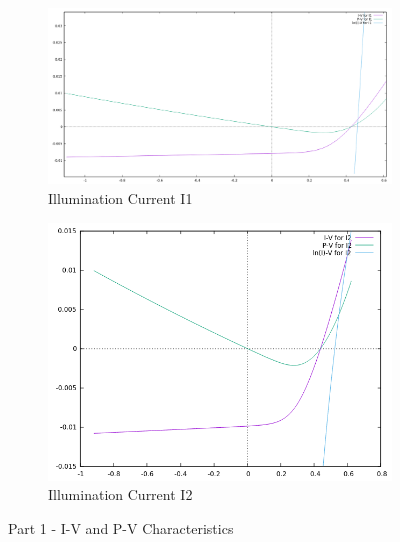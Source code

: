 \documentclass[12pt]{article}
\begin{document}
\begin{figure}[H]
	\begin{subfigure}[b]{0.60\linewidth}
	   	\includegraphics[width = \linewidth, trim = {0 0 0 0}, clip]{part1_I1.png}
		\caption{Illumination Current I1}
	\end{subfigure}
	\begin{subfigure}[b]{0.51\linewidth}
		\includegraphics[width = \linewidth, trim = {0 0 0 0}, clip]{part1_I2.png}
		\caption{Illumination Current I2}
	\end{subfigure} 
	\caption{Part 1 - I-V and P-V Characteristics}
\end{figure}
\end{document}
